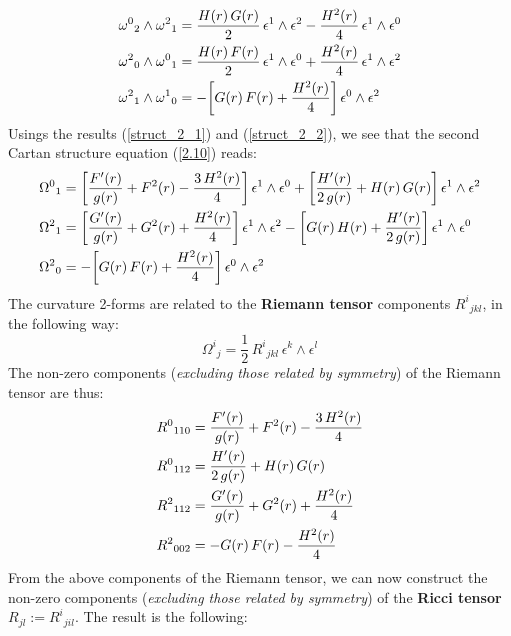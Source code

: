 %
%
\begin{align}\label{struct_2_1}
{\omega^0}_2 \wedge {\omega^2}_1 & = \frac{H(r) \, G(r)}{2} \, \epsilon^1 \wedge \epsilon^2
- \frac{H^2(r)}{4} \, \epsilon^1 \wedge \epsilon^0
\notag\\
{\omega^2}_0 \wedge {\omega^0}_1 & = \frac{H(r) \, F(r)}{2} \, \epsilon^1 \wedge \epsilon^0
+ \frac{H^2(r)}{4} \, \epsilon^1 \wedge \epsilon^2
\notag\\
{\omega^2}_1 \wedge {\omega^1}_0 & = -\bigg[ G(r) \, F(r)
+ \frac{H^2(r)}{4} \bigg] \, \epsilon^0 \wedge \epsilon^2
\end{align}
%
%
Usings the results (\ref{struct_2_1}) and (\ref{struct_2_2}), we see that the second Cartan structure equation (\ref{2.10}) reads:
%
%
\begin{align}\label{struct_2_2}
{\Omega^0}_1 & = \bigg[ \frac{F'(r)}{g(r)}
+ F^2(r)
- \frac{3 \, H^2(r)}{4} \bigg] \, \epsilon^1 \wedge \epsilon^0
%
+ \bigg[ \frac{H'(r)}{2 \, g(r)}
+ H(r) \, G(r) \bigg] \, \epsilon^1 \wedge \epsilon^2
\notag\\
{\Omega^2}_1 & = \bigg[ \frac{G'(r)}{g(r)}
+ G^2(r)
+ \frac{H^2(r)}{4} \bigg] \, \epsilon^1 \wedge \epsilon^2
%
- \bigg[ G(r) \, H(r)
+ \frac{H'(r)}{2 \, g(r)} \bigg] \, \epsilon^1 \wedge \epsilon^0
\notag\\
{\Omega^2}_0 & = -\bigg[ G(r) \, F(r)
+ \frac{H^2(r)}{4} \bigg] \, \epsilon^0 \wedge \epsilon^2
\end{align}
%
%
The curvature 2-forms are related to the \textbf{Riemann tensor} components ${R^i}_{jkl}$, in the following way:
%
%
\begin{equation}
{\Omega^i}_j = \frac{1}{2} \, {R^i}_{jkl} \, \epsilon^k \wedge \epsilon^l
\end{equation}
%
%
The non-zero components (\textit{excluding those related by symmetry}) of the Riemann tensor are thus:
%
%
\begin{align}\label{2.14}
{R^0}_{110} & = \frac{F'(r)}{g(r)} + F^2(r) - \frac{3 \, H^2(r)}{4}
\notag\\
{R^0}_{112} & = \frac{H'(r)}{2 \, g(r)} + H(r) \, G(r)
\notag\\
{R^2}_{112} & = \frac{G'(r)}{g(r)} + G^2(r) + \frac{H^2(r)}{4}
\notag\\
{R^2}_{002} & = -G(r) \, F(r) - \frac{H^2(r)}{4}
\end{align}
%
%
From the above components of the Riemann tensor, we can now construct the non-zero components (\textit{excluding those related by symmetry}) of the \textbf{Ricci tensor} $R_{jl} := {R^i}_{jil}$. The result is the following:
